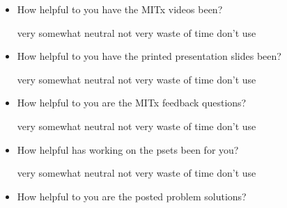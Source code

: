 \documentclass[handout]{mcs}
\begin{document}
\begin{itemize}
\begin{itemize}
\item How helpful to you have the MITx videos been?

\begin{center}
very\hspace{0.3in} somewhat \hspace{0.3in} neutral\hspace{0.3in} not
very \hspace{0.3in} waste of time  \hspace{0.7in}don't use
\end{center}

\item How helpful to you have the printed presentation slides been?

\begin{center}
very\hspace{0.3in} somewhat \hspace{0.3in} neutral\hspace{0.3in} not
very \hspace{0.3in} waste of time  \hspace{0.7in}don't use
\end{center}

\item How helpful to you are the MITx feedback questions?

\begin{center}
very\hspace{0.3in} somewhat \hspace{0.3in} neutral\hspace{0.3in} not
very \hspace{0.3in} waste of time  \hspace{0.7in}don't use
\end{center}

\item How helpful has working on the psets been for you?
 
\begin{center}
very\hspace{0.3in} somewhat \hspace{0.3in} neutral\hspace{0.3in} not
very \hspace{0.3in} waste of time  \hspace{0.7in}don't use
\end{center}

\newpage

\item How helpful to you are the posted problem solutions?
 

\end{itemize}
\end{itemize}
\end{document}
